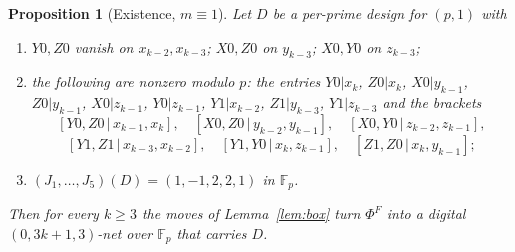 \documentclass[11pt]{amsart}
\newtheorem{proposition}[theorem]{Proposition}
\theoremstyle{definition}
\theoremstyle{plain}
\newcommand{\F}{\mathbb{F}}
\begin{document}
\begin{proposition}[Existence, $m\equiv1$]\label{prop:pp1}
Let $D$ be a per-prime design for $(p,1)$ with
\begin{enumerate}
\sloppy
\item[(V1)] $Y0,Z0$ vanish on $x_{k-2},x_{k-3}$; $X0,Z0$ on $y_{k-3}$; $X0,Y0$ on $z_{k-3}$;
\item[(U1)] the following are nonzero modulo $p$: the entries $Y0|x_k$, $Z0|x_k$, $X0|y_{k-1}$, $Z0|y_{k-1}$, $X0|z_{k-1}$, $Y0|z_{k-1}$, $Y1|x_{k-2}$, $Z1|y_{k-3}$, $Y1|z_{k-3}$ and the brackets
\[[Y0,Z0\,|\,x_{k-1},x_k],\quad[X0,Z0\,|\,y_{k-2},y_{k-1}],\quad[X0,Y0\,|\,z_{k-2},z_{k-1}],\]
\[[Y1,Z1\,|\,x_{k-3},x_{k-2}],\quad[Y1,Y0\,|\,x_k,z_{k-1}],\quad[Z1,Z0\,|\,x_k,y_{k-1}];\]
\item[(I1)] $(J_1,\dots,J_5)(D)=(1,-1,2,2,1)$ in $\F_p$.
\end{enumerate}
Then for every $k\ge3$ the moves of Lemma~\ref{lem:box} turn $\Phi^F$ into a digital $(0,3k+1,3)$-net over $\F_p$ that carries $D$.
\end{proposition}
\end{document}
